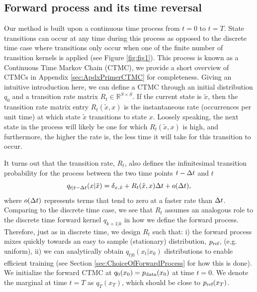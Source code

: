 \documentclass{article}
\begin{document}
\subsection{Forward process and its time reversal}
Our method is built upon a continuous time process from $t=0$ to $t=T$. State transitions can occur at any time during this process as opposed to the discrete time case where transitions only occur when one of the finite number of transition kernels is applied (see Figure \ref{fig:fig1}). This process is known as a Continuous Time Markov Chain (CTMC), we provide a short overview of CTMCs in Appendix \ref{sec:ApdxPrimerCTMC} for completeness. Giving an intuitive introduction here, we can define a CTMC through an initial distribution $q_0$ and a transition rate matrix $R_t \in \mathbb{R}^{S \times S}$. If the current state is $\tilde{x}$, then the transition rate matrix entry $R_t(\tilde{x}, x)$ is the instantaneous rate (occurrences per unit time) at which state $\tilde{x}$ transitions to state $x$. Loosely speaking, the next state in the process will likely be one for which $R_t(\tilde{x}, x)$ is high, and furthermore, the higher the rate is, the less time it will take for this transition to occur.

It turns out that the transition rate, $R_t$, also defines the infinitesimal transition probability for the process between the two time points $t-\Delta t$ and $t$
\begin{equation}
    \textstyle q_{t | t-\Delta t}(x | \tilde{x}) = \delta_{x, \tilde{x}} + R_t(\tilde{x}, x) \Delta t + o(\Delta t),
\end{equation}
where $o(\Delta t)$ represents terms that tend to zero at a faster rate than $\Delta t$.
Comparing to the discrete time case, we see that $R_t$ assumes an analogous role to the discrete time forward kernel $q_{k+1|k}$ in how we define the forward process.
Therefore, just as in discrete time, we design $R_t$ such that: i) the forward process mixes quickly towards an easy to sample (stationary) distribution, $p_{\textrm{ref}}$, (e.g. uniform), ii) we can analytically obtain $q_{t|0}(x_t | x_0)$ distributions to enable efficient training (see Section \ref{sec:ChoiceOfForwardProcess} for how this is done). We initialize the forward CTMC at $q_0(x_0) = p_{\textup{data}}(x_0)$ at time $t=0$. We denote the marginal at time $t=T$ as $q_T(x_T)$, which should be close to $p_{\textrm{ref}}(x_T)$.
\end{document}
